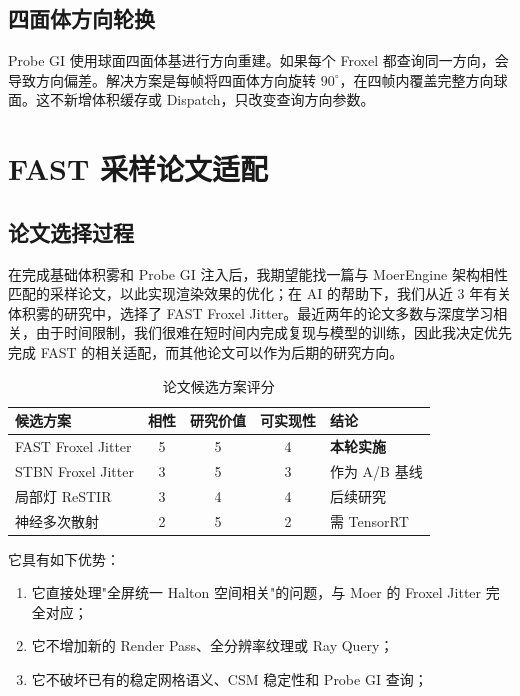 \documentclass[11pt,a4paper]{article}
\begin{document}
\subsection{四面体方向轮换}

Probe GI 使用球面四面体基进行方向重建。如果每个 Froxel 都查询同一方向，会导致方向偏差。解决方案是每帧将四面体方向旋转 $90^\circ$，在四帧内覆盖完整方向球面。这不新增体积缓存或 Dispatch，只改变查询方向参数。

\section{FAST 采样论文适配}

\subsection{论文选择过程}

在完成基础体积雾和 Probe GI 注入后，我期望能找一篇与 MoerEngine 架构相性匹配的采样论文，以此实现渲染效果的优化；在 AI 的帮助下，我们从近 3 年有关体积雾的研究中，选择了 FAST Froxel Jitter。最近两年的论文多数与深度学习相关，由于时间限制，我们很难在短时间内完成复现与模型的训练，因此我决定优先完成 FAST 的相关适配，而其他论文可以作为后期的研究方向。

\begin{table}[H]
\centering
\small
\begin{tabularx}{\textwidth}{lcccl}
\toprule
\textbf{候选方案} & \textbf{相性} & \textbf{研究价值} & \textbf{可实现性} & \textbf{结论} \\
\midrule
FAST Froxel Jitter & 5 & 5 & 4 & \textbf{本轮实施} \\
STBN Froxel Jitter & 3 & 5 & 3 & 作为 A/B 基线 \\
局部灯 ReSTIR & 3 & 4 & 4 & 后续研究 \\
神经多次散射 & 2 & 5 & 2 & 需 TensorRT \\
\bottomrule
\end{tabularx}
\caption{论文候选方案评分}
\end{table}

它具有如下优势：
\begin{enumerate}
    \item 它直接处理"全屏统一 Halton 空间相关"的问题，与 Moer 的 Froxel Jitter 完全对应；
    \item 它不增加新的 Render Pass、全分辨率纹理或 Ray Query；
    \item 它不破坏已有的稳定网格语义、CSM 稳定性和 Probe GI 查询；
\end{enumerate}
\end{document}
